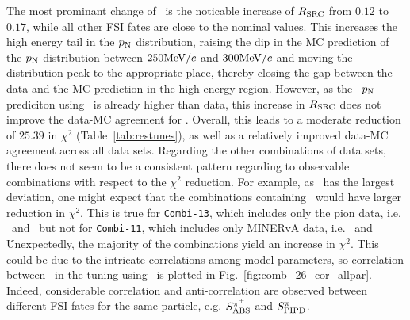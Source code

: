     The most prominant change of \gT\ is the noticable increase of $R_\textrm{SRC}$ from $0.12$ to $0.17$, while all other FSI fates are close to the nominal values.
    This increases the high energy tail in the $p_\textrm{N}$ distribution, raising the dip in the MC prediction of the $p_\textrm{N}$ distribution between $250\textrm{MeV}/c$ and $300\textrm{MeV}/c$ and moving the distribution peak to the appropriate place, thereby closing the gap between the data and the MC prediction in the high energy region.
    However, as the \minpiz\ $p_\textrm{N}$ prediciton using \gZero\ is already higher than data, this increase in $R_\textrm{SRC}$ does not improve the data-MC agreement for \minpiz.
    Overall, this leads to a moderate reduction of $25.39$ in $\chi^2$ (Table~\ref{tab:restunes}), as well as a relatively improved data-MC agreement across all data sets. 
    Regarding the other combinations of data sets, there does not seem to be a consistent pattern regarding to observable combinations with respect to the $\chi^2$ reduction.
    For example, as \minpiz\ has the largest deviation, one might expect that the combinations containing \minpiz\ would have larger reduction in $\chi^2$. 
    This is true for \texttt{Combi-13}, which includes only the pion data, i.e. \ttkpip\ and \minpiz\, but not for \texttt{Combi-11}, which includes only MINERvA data, i.e. \minzpi\ and \minpiz\.
    Unexpectedly, the majority of the combinations yield an increase in $\chi^2$.
    This could be due to the intricate correlations among model parameters, so correlation between \allpar\ in the tuning using \cbAllPar\ is plotted in Fig.~\ref{fig:comb_26_cor_allpar}.
    Indeed, considerable correlation and anti-correlation are observed between different FSI fates for the same particle, e.g. $S_\textrm{ABS}^{\pi^{\pm}}$ and $S_\textrm{PIPD}^{\pi}$. 
